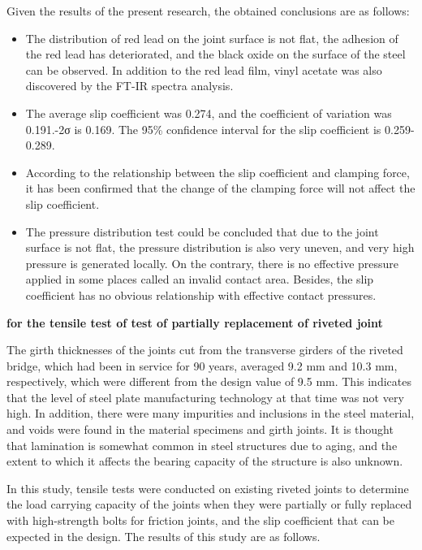 Given the results of the present research, the obtained conclusions are as follows: 

\begin{itemize}
    \item The distribution of red lead on the joint surface is not flat, the adhesion of the red lead has deteriorated, and the black oxide on the surface of the steel can be observed. In addition to the red lead film, vinyl acetate was also discovered by the FT-IR spectra analysis. 

    \item The average slip coefficient was 0.274, and the coefficient of variation was 0.191.-2σ is 0.169. The 95\% confidence interval for the slip coefficient is 0.259-0.289. 

    \item According to the relationship between the slip coefficient and clamping force, it has been confirmed that the change of the clamping force will not affect the slip coefficient.

    \item The pressure distribution test could be concluded that due to the joint surface is not flat, the pressure distribution is also very uneven, and very high pressure is generated locally. On the contrary, there is no effective pressure applied in some places called an invalid contact area. Besides, the slip coefficient has no obvious relationship with effective contact pressures.
    
\end{itemize}

\textbf{for the tensile test of test of partially replacement of riveted joint}

The girth thicknesses of the joints cut from the transverse girders of the riveted bridge, which had been in service for 90 years, averaged 9.2 mm and 10.3 mm, respectively, which were different from the design value of 9.5 mm. This indicates that the level of steel plate manufacturing technology at that time was not very high. In addition, there were many impurities and inclusions in the steel material, and voids were found in the material specimens and girth joints. It is thought that lamination is somewhat common in steel structures due to aging, and the extent to which it affects the bearing capacity of the structure is also unknown.

In this study, tensile tests were conducted on existing riveted joints to determine the load carrying capacity of the joints when they were partially or fully replaced with high-strength bolts for friction joints, and the slip coefficient that can be expected in the design. The results of this study are as follows.

